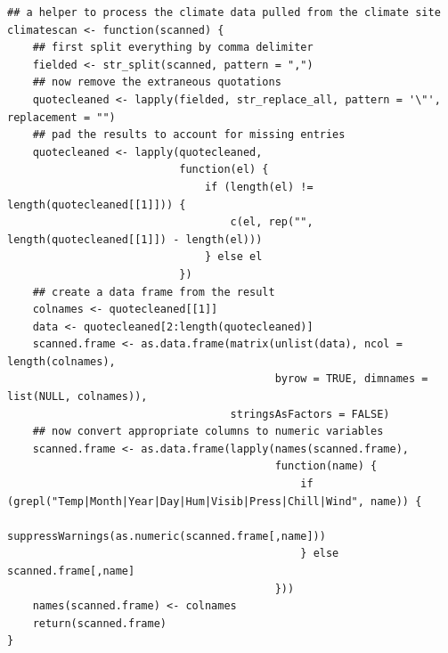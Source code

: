 \documentclass{article}
\begin{document}
\begin{lstlisting}
## a helper to process the climate data pulled from the climate site
climatescan <- function(scanned) {
    ## first split everything by comma delimiter
    fielded <- str_split(scanned, pattern = ",")
    ## now remove the extraneous quotations
    quotecleaned <- lapply(fielded, str_replace_all, pattern = '\"', replacement = "")
    ## pad the results to account for missing entries
    quotecleaned <- lapply(quotecleaned,
                           function(el) {
                               if (length(el) != length(quotecleaned[[1]])) {
                                   c(el, rep("", length(quotecleaned[[1]]) - length(el)))
                               } else el
                           })
    ## create a data frame from the result
    colnames <- quotecleaned[[1]]
    data <- quotecleaned[2:length(quotecleaned)]
    scanned.frame <- as.data.frame(matrix(unlist(data), ncol = length(colnames),
                                          byrow = TRUE, dimnames = list(NULL, colnames)),
                                   stringsAsFactors = FALSE)
    ## now convert appropriate columns to numeric variables
    scanned.frame <- as.data.frame(lapply(names(scanned.frame),
                                          function(name) {
                                              if (grepl("Temp|Month|Year|Day|Hum|Visib|Press|Chill|Wind", name)) {
                                                  suppressWarnings(as.numeric(scanned.frame[,name]))
                                              } else scanned.frame[,name]
                                          }))
    names(scanned.frame) <- colnames
    return(scanned.frame)
}


\end{lstlisting}
\end{document}
